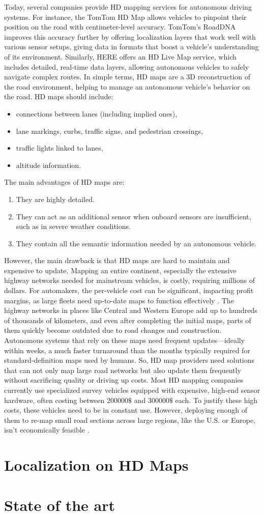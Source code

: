 Today, several companies provide HD mapping services for autonomous driving systems. For instance, the TomTom HD Map allows vehicles to pinpoint their position on the road with centimeter-level accuracy. TomTom’s RoadDNA improves this accuracy further by offering localization layers that work well with various sensor setups, giving data in formats that boost a vehicle’s understanding of its environment. Similarly, HERE offers an HD Live Map service, which includes detailed, real-time data layers, allowing autonomous vehicles to safely navigate complex routes.
In simple terms, HD maps are a 3D reconstruction of the road environment, helping to manage an autonomous vehicle’s behavior on the road. HD maps should include:
\begin{itemize}
    \item connections between lanes (including implied ones),
    \item lane markings, curbs, traffic signs, and pedestrian crossings,
    \item traffic lights linked to lanes,
    \item altitude information.
\end{itemize}
The main advantages of HD maps are:
\begin{enumerate}
    \item They are highly detailed.
    \item They can act as an additional sensor when onboard sensors are insufficient, such as in severe weather conditions.
    \item They contain all the semantic information needed by an autonomous vehicle.
\end{enumerate}

However, the main drawback is that HD maps are hard to maintain and expensive to update. Mapping an entire continent, especially the extensive highway networks needed for mainstream vehicles, is costly, requiring millions of dollars. For automakers, the per-vehicle cost can be significant, impacting profit margins, as large fleets need up-to-date maps to function effectively \cite{gitlin2017detailedmaps}.
The highway networks in places like Central and Western Europe add up to hundreds of thousands of kilometers, and even after completing the initial maps, parts of them quickly become outdated due to road changes and construction. Autonomous systems that rely on these maps need frequent updates—ideally within weeks, a much faster turnaround than the months typically required for standard-definition maps used by humans.
So, HD map providers need solutions that can not only map large road networks but also update them frequently without sacrificing quality or driving up costs. Most HD mapping companies currently use specialized survey vehicles equipped with expensive, high-end sensor hardware, often costing between $200000\$$ and $300000\$$ each. To justify these high costs, these vehicles need to be in constant use. However, deploying enough of them to re-map small road sections across large regions, like the U.S. or Europe, isn’t economically feasible \cite{dahlstrom2021hdmaps}.

\section{Localization on HD Maps}

\section{State of the art}